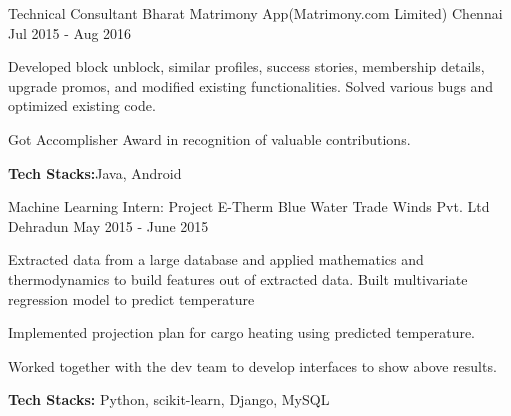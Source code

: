 \begin{cventries}
  \cventry
    {Technical Consultant} %
    {Bharat Matrimony App(Matrimony.com Limited)} %
    {Chennai} %
    {Jul 2015 - Aug 2016} %
    {
      \begin{cvitems} %
        \item {Developed block unblock, similar profiles, success stories, membership details, upgrade promos, and modified existing functionalities. Solved various bugs and optimized existing code.}
        \item {Got Accomplisher Award in recognition of valuable contributions.}
        \item {\textbf{Tech Stacks:}Java, Android}
      \end{cvitems}
    }

  \cventry
    {Machine Learning Intern: Project E-Therm} %
    {Blue Water Trade Winds Pvt. Ltd} %
    {Dehradun} %
    {May 2015 - June 2015} %
    {
      \begin{cvitems} %
        \item {Extracted data from a large database and applied mathematics and thermodynamics to build features out of extracted data. Built multivariate regression model to predict temperature}
        \item {Implemented projection plan for cargo heating using predicted temperature.}
        \item {Worked together with the dev team to develop interfaces to show above results.} 
        \item {\textbf{Tech Stacks:} Python, scikit-learn, Django, MySQL}
      \end{cvitems}
    }


\end{cventries}
